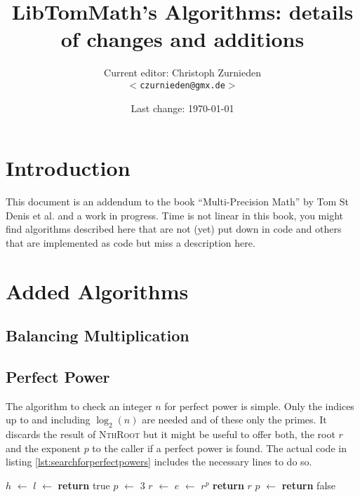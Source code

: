 \documentclass[a4paper,10pt]{report}
\newcommand*\Let[2]{\State #1 $\gets$ #2}
\newcommand{\RETURN}{\State \textbf{return} }
\theoremstyle{plain} %
\theoremstyle{definition}
\theoremstyle{remark}
\begin{document}
\title{LibTomMath's Algorithms: details of changes and additions}
\author{Current editor: Christoph Zurnieden\\
        \small{\texttt{$<$czurnieden@gmx.de$>$}}}
\date{Last change: \today}
\maketitle

\tableofcontents
\renewcommand{\ttdefault}{pcr}

\chapter*{Introduction}

This document is an addendum to the book ``Multi-Precision Math'' by Tom St Denis et al.\cite{stmulti} and a work in progress. Time is not linear in this book, you might find algorithms described here that are not (yet) put down in code and others that are implemented as code but miss a description here.

\chapter{Added Algorithms}
\section{Balancing Multiplication}

\section{Perfect Power}
The algorithm to check an integer $n$ for perfect power is simple. Only the indices up to and including $\log_2(n)$ are needed and of these only the primes. It discards the result of \textsc{NthRoot} but it might be useful to offer both, the root $r$ and the exponent $p$ to the caller if a perfect power is found. The actual code in listing \ref{lst:searchforperfectpowers} includes the necessary lines to do so.

\begin{center}
  \begin{algorithmic}[1]
      \Let{$h$}{}
      \Let{$l$}{}
       
         \RETURN true
      \EndIf
      \Let{$p$}{$3$}
         \Let{$r$}{}
         \Let{$e$}{$r^p$}
           \RETURN $r$
         \EndIf
         \Let{$p$}{}
      \EndWhile
      \RETURN false
    \EndFunction
  \end{algorithmic}
\end{center}
\end{document}

